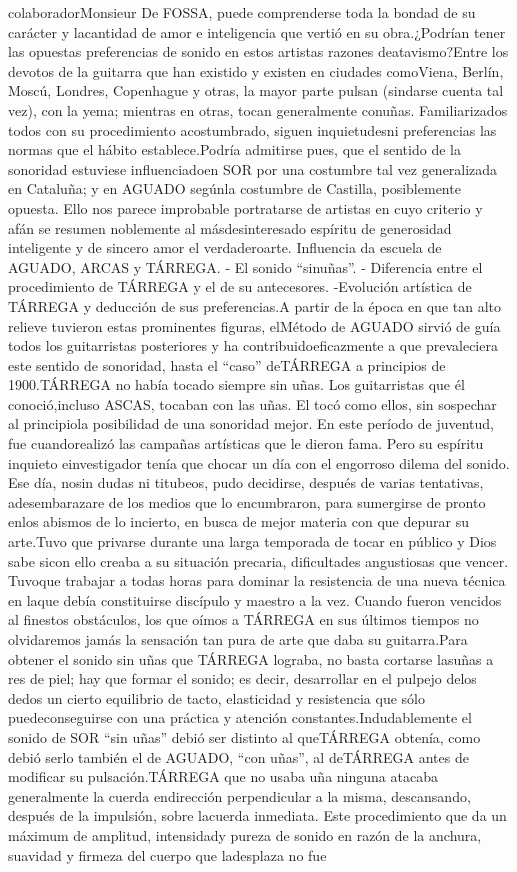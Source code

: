 \documentclass[
10pt, %
a4paper, %
oneside, %
headinclude,footinclude, %
BCOR5mm, %
]{scrartcl}
\begin{document}
{colaboradorMonsieur De FOSSA, puede comprenderse toda la bondad de su carácter y lacantidad de amor e inteligencia que vertió en su obra.¿Podrían tener las opuestas preferencias de sonido en estos artistas razones deatavismo?Entre los devotos de la guitarra que han existido y existen en ciudades comoViena, Berlín, Moscú, Londres, Copenhague y otras, la mayor parte pulsan (sindarse cuenta tal vez), con la yema; mientras en otras, tocan generalmente conuñas. Familiarizados todos con su procedimiento acostumbrado, siguen inquietudesni preferencias las normas que el hábito establece.Podría admitirse pues, que el sentido de la sonoridad estuviese influenciadoen SOR por una costumbre tal vez generalizada en Cataluña; y en AGUADO segúnla costumbre de Castilla, posiblemente opuesta. Ello nos parece improbable portratarse de artistas en cuyo criterio y afán se resumen noblemente al másdesinteresado espíritu de generosidad inteligente y de sincero amor el verdaderoarte. Influencia da escuela de AGUADO, ARCAS y TÁRREGA. - El sonido “sinuñas”. - Diferencia entre el procedimiento de TÁRREGA y el de su antecesores. -Evolución artística de TÁRREGA y deducción de sus preferencias.A partir de la época en que tan alto relieve tuvieron estas prominentes figuras, elMétodo de AGUADO sirvió de guía todos los guitarristas posteriores y ha contribuidoeficazmente a que prevaleciera este sentido de sonoridad, hasta el “caso” deTÁRREGA a principios de 1900.TÁRREGA no había tocado siempre sin uñas. Los guitarristas que él conoció,incluso ASCAS, tocaban con las uñas. El tocó como ellos, sin sospechar al principiola posibilidad de una sonoridad mejor. En este período de juventud, fue cuandorealizó las campañas artísticas que le dieron fama. Pero su espíritu inquieto einvestigador tenía que chocar un día con el engorroso dilema del sonido. Ese día, nosin dudas ni titubeos, pudo decidirse, después de varias tentativas, adesembarazare de los medios que lo encumbraron, para sumergirse de pronto enlos abismos de lo incierto, en busca de mejor materia con que depurar su arte.Tuvo que privarse durante una larga temporada de tocar en público y Dios sabe sicon ello creaba a su situación precaria, dificultades angustiosas que vencer. Tuvoque trabajar a todas horas para dominar la resistencia de una nueva técnica en laque debía constituirse discípulo y maestro a la vez. Cuando fueron vencidos al finestos obstáculos, los que oímos a TÁRREGA en sus últimos tiempos no olvidaremos jamás la sensación tan pura de arte que daba su guitarra.Para obtener el sonido sin uñas que TÁRREGA lograba, no basta cortarse lasuñas a res de piel; hay que formar el sonido; es decir, desarrollar en el pulpejo delos dedos un cierto equilibrio de tacto, elasticidad y resistencia que sólo puedeconseguirse con una práctica y atención constantes.Indudablemente el sonido de SOR “sin uñas” debió ser distinto al queTÁRREGA obtenía, como debió serlo también el de AGUADO, “con uñas”, al deTÁRREGA antes de modificar su pulsación.TÁRREGA que no usaba uña ninguna atacaba generalmente la cuerda endirección perpendicular a la misma, descansando, después de la impulsión, sobre lacuerda inmediata. Este procedimiento que da un máximum de amplitud, intensidady pureza de sonido en razón de la anchura, suavidad y firmeza del cuerpo que ladesplaza no fue }
\end{document}
